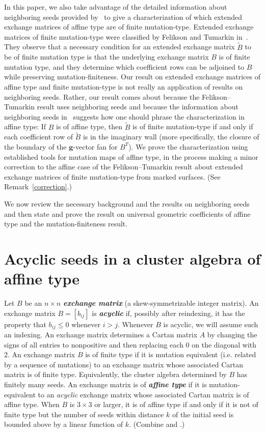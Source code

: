 \documentclass{amsart}
\theoremstyle{definition}
\theoremstyle{remark}
\numberwithin{equation}{section}
\newcommand{\newword}[1]{\textbf{\emph{#1}}}
\newcommand{\0}{{\mathbf{0}}}
\newcommand{\g}{\mathbf{g}}
\newcommand{\tB}{{\widetilde{B}}}
\begin{document}
In this paper, we also take advantage of the detailed information about neighboring seeds provided by~\cite{affdomreg} to give a characterization of which extended exchange matrices of affine type are of finite mutation-type.
Extended exchange matrices of finite mutation-type were classified by Felikson and Tumarkin in~\cite{FeTuCoeff}.
They observe that a necessary condition for an extended exchange matrix $\tB$ to be of finite mutation type is that the underlying exchange matrix $B$ is of finite mutation type, and they determine which coefficient rows can be adjoined to $B$ while preserving mutation-finiteness.
Our result on extended exchange matrices of affine type and finite mutation-type is not really an application of results on neighboring seeds.
Rather, our result comes about because the Felikson--Tumarkin result uses neighboring seeds and because the information about neighboring seeds in~\cite{affdomreg} suggests how one should phrase the characterization in affine type:
If $B$ is of affine type, then $\tB$ is of finite mutation-type if and only if each coefficient row of $\tB$ is in the imaginary wall (more specifically, the closure of the boundary of the $\g$-vector fan for $B^T$). 
We prove the characterization using established tools for mutation maps of affine type, in the process making a minor correction to the affine case of the Felikson--Tumarkin result about extended exchange matrices of finite mutation-type from marked surfaces.
(See Remark~\ref{correction}.)

We now review the necessary background and the results on neighboring seeds and then state and prove the result on universal geometric coefficients of affine type and the mutation-finiteness result.

\section{Acyclic seeds in a cluster algebra of affine type}\label{acyc sec}
Let $B$ be an $n\times n$ \newword{exchange matrix} (a skew-symmetrizable integer matrix).
An exchange matrix $B=[b_{ij}]$ is \newword{acyclic} if, possibly after reindexing, it has the property that $b_{ij}\leq 0$ whenever $i>j$.
Whenever $B$ is acyclic, we will assume such an indexing.
An exchange matrix determines a Cartan matrix $A$ by changing the signs of all entries to nonpositive and then replacing each $0$ on the diagonal with $2$.
An exchange matrix $B$ is of finite type if it is mutation equivalent (i.e. related by a sequence of mutations) to an exchange matrix whose associated Cartan matrix is of finite type.
Equivalently, the cluster algebra determined by $B$ has finitely many seeds.
An exchange matrix is of \newword{affine type} if it is mutation-equivalent to an \emph{acyclic} exchange matrix whose associated Cartan matrix is of affine type.
When $B$ is $3\times 3$ or larger, it is of affine type if and only if it is not of finite type but the number of seeds within distance $k$ of the initial seed is bounded above by a linear function of $k$.
(Combine \cite[Theorem~3.5]{Seven} and \cite[Theorem~1.1]{FeShThTu12}.)
\end{document}
